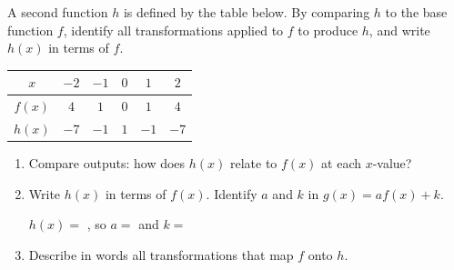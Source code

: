 \documentclass[10pt]{article}
\begin{document}
\begin{tcolorbox}[colback=white, colframe=black!40,
    title=\textbf{Tier E --- Extend},
    fonttitle=\bfseries, arc=2mm, left=3mm, right=3mm, top=2mm, bottom=2mm]

A second function $h$ is defined by the table below. By comparing $h$ to the base function
$f$, identify all transformations applied to $f$ to produce $h$, and write $h(x)$ in terms
of $f$.

\medskip
\renewcommand{\arraystretch}{1.25}
\begin{tabular}{|c|c|c|c|c|c|}
\hline
$x$    & $-2$ & $-1$ & $0$ & $1$ & $2$ \\
\hline
$f(x)$ & $4$  & $1$  & $0$ & $1$ & $4$ \\
\hline
$h(x)$ & $-7$ & $-1$ & $1$ & $-1$ & $-7$ \\
\hline
\end{tabular}

\medskip
\begin{enumerate}[itemsep=8pt]
  \item Compare outputs: how does $h(x)$ relate to $f(x)$ at each $x$-value?

        \vspace{0.05in}

  \item Write $h(x)$ in terms of $f(x)$. Identify $a$ and $k$ in $g(x) = af(x)+k$.

        \vspace{0.05in}
        $h(x) = $ \blank{5cm}, so $a = $ \blank{1.5cm} and $k = $ \blank{1.5cm}

  \item Describe in words all transformations that map $f$ onto $h$.

        \vspace{0.05in}
\end{enumerate}

\end{tcolorbox}
\end{document}

